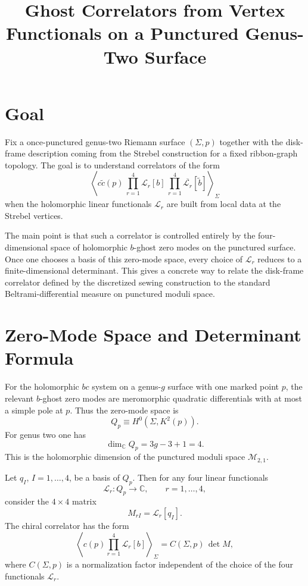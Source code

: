 \documentclass[12pt]{article}
\title{Ghost Correlators from Vertex Functionals on a Punctured Genus-Two Surface}
\author{}
\date{}
\newcommand{\cL}{\mathcal{L}}
\newcommand{\cM}{\mathcal{M}}
\newcommand{\bC}{\mathbb{C}}
\newcommand{\wt}[1]{\widetilde{#1}}
\newcommand{\ol}[1]{\overline{#1}}
\begin{document}
\maketitle

\section{Goal}

Fix a once-punctured genus-two Riemann surface $(\Sigma,p)$ together with the disk-frame description coming from the Strebel construction for a fixed ribbon-graph topology. The goal is to understand correlators of the form
\begin{equation}
\left\langle c\wt{c}(p)\,\prod_{r=1}^4 \cL_r[b] \, \prod_{r=1}^4 \ol{\cL_r}[\wt{b}]\right\rangle_{\Sigma}
\end{equation}
when the holomorphic linear functionals $\cL_r$ are built from local data at the Strebel vertices.

The main point is that such a correlator is controlled entirely by the four-dimensional space of holomorphic $b$-ghost zero modes on the punctured surface. Once one chooses a basis of this zero-mode space, every choice of $\cL_r$ reduces to a finite-dimensional determinant. This gives a concrete way to relate the disk-frame correlator defined by the discretized sewing construction to the standard Beltrami-differential measure on punctured moduli space.

\section{Zero-Mode Space and Determinant Formula}

For the holomorphic $bc$ system on a genus-$g$ surface with one marked point $p$, the relevant $b$-ghost zero modes are meromorphic quadratic differentials with at most a simple pole at $p$. Thus the zero-mode space is
\begin{equation}
Q_p \equiv H^0(\Sigma,K^2(p)).
\end{equation}
For genus two one has
\begin{equation}
\dim_{\bC} Q_p = 3g-3+1 = 4.
\end{equation}
This is the holomorphic dimension of the punctured moduli space $\cM_{2,1}$.

Let $q_I$, $I=1,\dots,4$, be a basis of $Q_p$. Then for any four linear functionals
\begin{equation}
\cL_r: Q_p \to \bC, \qquad r=1,\dots,4,
\end{equation}
consider the $4\times 4$ matrix
\begin{equation}
M_{rI}=\cL_r[q_I].
\end{equation}
The chiral correlator has the form
\begin{equation}
\left\langle c(p)\prod_{r=1}^4 \cL_r[b]\right\rangle_{\Sigma}
= C(\Sigma,p)\,\det M,
\label{eq:basicdet}
\end{equation}
where $C(\Sigma,p)$ is a normalization factor independent of the choice of the four functionals $\cL_r$.
\end{document}
